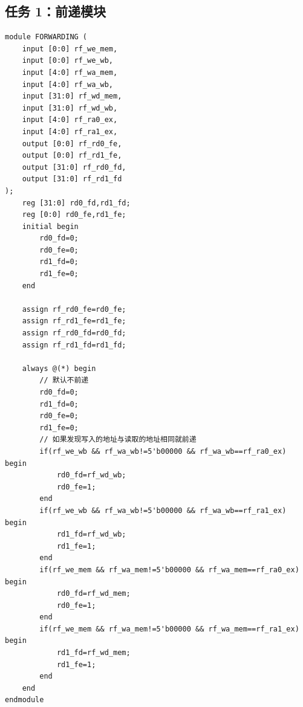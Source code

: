 \documentclass[12pt,a4paper]{ctexart}
\begin{document}
\subsection{任务 1：前递模块}
\begin{lstlisting}[style=verilog]
module FORWARDING (
    input [0:0] rf_we_mem,
    input [0:0] rf_we_wb,
    input [4:0] rf_wa_mem,
    input [4:0] rf_wa_wb,
    input [31:0] rf_wd_mem,
    input [31:0] rf_wd_wb,
    input [4:0] rf_ra0_ex,
    input [4:0] rf_ra1_ex,
    output [0:0] rf_rd0_fe,
    output [0:0] rf_rd1_fe,
    output [31:0] rf_rd0_fd,
    output [31:0] rf_rd1_fd
);
    reg [31:0] rd0_fd,rd1_fd;
    reg [0:0] rd0_fe,rd1_fe;
    initial begin
        rd0_fd=0;
        rd0_fe=0;
        rd1_fd=0;
        rd1_fe=0;
    end

    assign rf_rd0_fe=rd0_fe;
    assign rf_rd1_fe=rd1_fe;
    assign rf_rd0_fd=rd0_fd;
    assign rf_rd1_fd=rd1_fd;

    always @(*) begin
        // 默认不前递
        rd0_fd=0;
        rd1_fd=0;
        rd0_fe=0;
        rd1_fe=0;
        // 如果发现写入的地址与读取的地址相同就前递
        if(rf_we_wb && rf_wa_wb!=5'b00000 && rf_wa_wb==rf_ra0_ex) begin
            rd0_fd=rf_wd_wb;
            rd0_fe=1;
        end 
        if(rf_we_wb && rf_wa_wb!=5'b00000 && rf_wa_wb==rf_ra1_ex) begin
            rd1_fd=rf_wd_wb;
            rd1_fe=1;
        end 
        if(rf_we_mem && rf_wa_mem!=5'b00000 && rf_wa_mem==rf_ra0_ex) begin
            rd0_fd=rf_wd_mem;
            rd0_fe=1;
        end 
        if(rf_we_mem && rf_wa_mem!=5'b00000 && rf_wa_mem==rf_ra1_ex) begin
            rd1_fd=rf_wd_mem;
            rd1_fe=1;
        end 
    end
endmodule
\end{lstlisting}
\end{document}
